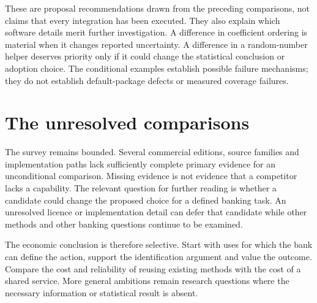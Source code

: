 These are proposal recommendations drawn from the preceding comparisons, not
claims that every integration has been executed. They also explain which
software details merit further investigation. A difference in coefficient
ordering is material when it changes reported uncertainty. A difference in a
random-number helper deserves priority only if it could change the statistical
conclusion or adoption choice. The conditional examples establish possible
failure mechanisms; they do not establish default-package defects or measured
coverage failures.~\citep{exec29_panel_inference_sources,exec29_panel_runtime_reference}

\section{The unresolved comparisons}

The survey remains bounded. Several commercial editions, source families and
implementation paths lack sufficiently complete primary evidence for an
unconditional comparison. Missing evidence is not evidence that a competitor
lacks a capability. The relevant question for further reading is whether a
candidate could change the proposed choice for a defined banking task.
An unresolved licence or implementation detail can defer that candidate while
other methods and other banking questions continue to be examined.

The economic conclusion is therefore selective. Start with uses for which the
bank can define the action, support the identification argument and value the
outcome. Compare the cost and reliability of reusing existing methods with the
cost of a shared service. More general ambitions remain research questions
where the necessary information or statistical result is absent.
